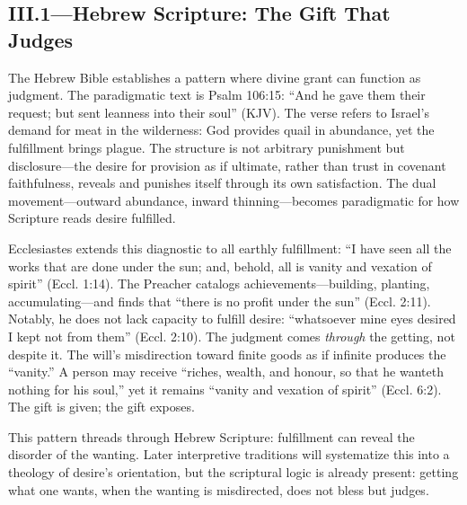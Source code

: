 \subsection*{III.1—Hebrew Scripture: The Gift That Judges}
\label{ssec:iii-hebrew-scripture}

The Hebrew Bible establishes a pattern where divine grant can function as judgment. The
paradigmatic text is Psalm 106:15: ``And he gave them their request; but sent leanness into
their soul'' (KJV). The verse refers to Israel's demand for meat in the wilderness: God
provides quail in abundance, yet the fulfillment brings plague. The structure is not arbitrary
punishment but disclosure---the desire for provision as if ultimate, rather than trust in
covenant faithfulness, reveals and punishes itself through its own satisfaction. The dual
movement---outward abundance, inward thinning---becomes paradigmatic for how Scripture reads
desire fulfilled.

Ecclesiastes extends this diagnostic to all earthly fulfillment: ``I have seen all the works
that are done under the sun; and, behold, all is vanity and vexation of spirit'' (Eccl.
1:14). The Preacher catalogs achievements---building, planting, accumulating---and finds that
``there is no profit under the sun'' (Eccl. 2:11). Notably, he does not lack capacity to
fulfill desire: ``whatsoever mine eyes desired I kept not from them'' (Eccl. 2:10). The
judgment comes \emph{through} the getting, not despite it. The will's misdirection toward
finite goods as if infinite produces the ``vanity.'' A person may receive ``riches, wealth,
and honour, so that he wanteth nothing for his soul,'' yet it remains ``vanity and vexation
of spirit'' (Eccl. 6:2). The gift is given; the gift exposes.

This pattern threads through Hebrew Scripture: fulfillment can reveal the disorder of the
wanting. Later interpretive traditions will systematize this into a theology of desire's
orientation, but the scriptural logic is already present: getting what one wants, when the
wanting is misdirected, does not bless but judges.
